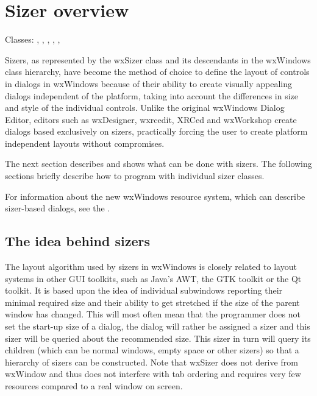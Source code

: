 \section{Sizer overview}\label{sizeroverview}

Classes: , , 
, , 
, 

Sizers, as represented by the wxSizer class and its descendants in
the wxWindows class hierarchy, have become the method of choice to
define the layout of controls in dialogs in wxWindows because of
their ability to create visually appealing dialogs independent of the
platform, taking into account the differences in size and style of
the individual controls. Unlike the original wxWindows Dialog Editor,
editors such as wxDesigner, wxrcedit, XRCed and wxWorkshop create dialogs based exclusively on sizers,
practically forcing the user to create platform independent layouts without compromises.

The next section describes and shows what can be done with sizers.
The following sections briefly describe how to program with individual sizer classes.

For information about the new wxWindows resource system, which can describe
sizer-based dialogs, see the .

\subsection{The idea behind sizers}\label{ideabehindsizers}

The layout algorithm used by sizers in wxWindows is closely related to layout
systems in other GUI toolkits, such as Java's AWT, the GTK toolkit or the Qt toolkit. It is
based upon the idea of individual subwindows reporting their minimal required
size and their ability to get stretched if the size of the parent window has changed.
This will most often mean that the programmer does not set the start-up size of
a dialog, the dialog will rather be assigned a sizer and this sizer
will be queried about the recommended size. This sizer in turn will query its
children (which can be normal windows, empty space or other sizers) so that
a hierarchy of sizers can be constructed. Note that wxSizer does not derive from wxWindow
and thus does not interfere with tab ordering and requires very few resources compared
to a real window on screen.


